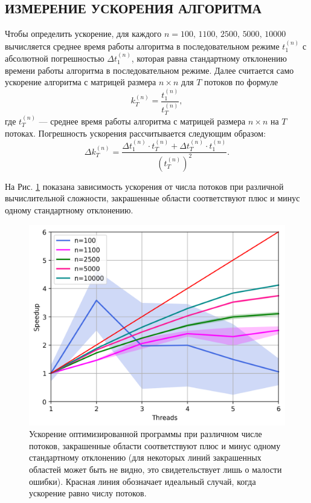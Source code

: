 \subsection{ИЗМЕРЕНИЕ УСКОРЕНИЯ АЛГОРИТМА}

Чтобы определить ускорение, для каждого $n=100,\, 1100,\, 2500,\, 5000,\, 10000$ вычисляется среднее время работы алгоритма в последовательном режиме $t^{(n)}_1$ с абсолютной погрешностью $\Delta t^(n)_1$, которая равна стандартному отклонению времени работы алгоритма в последовательном режиме. Далее считается само ускорение алгоритма с матрицей размера $n\times n$ для $T$ потоков по формуле
\begin{equation}
    k^{(n)}_T = \dfrac{t^{(n)}_1}{t^{(n)}_T},
\end{equation}
где $t^{(n)}_T$ --- среднее время работы алгоритма с матрицей размера $n\times n$ на $T$ потоках. Погрешность ускорения рассчитывается следующим образом:
\begin{equation}
   \Delta k^{(n)}_T = \dfrac{\Delta t^{(n)}_1 \cdot t^{(n)}_T + \Delta t^{(n)}_T \cdot t^{(n)}_1}{(t^{(n)}_T)^2}.
\end{equation}

На Рис. \ref{fig:speedup_vs_threads} показана зависимость ускорения от числа потоков при различной вычислительной сложности, закрашенные области соответствуют плюс и минус одному стандартному отклонению.
\begin{figure}[htbp]
    \centering
    \includegraphics[scale=0.75]{fig/speedup_vs_threads.png}
    \caption{Ускорение оптимизированной программы при различном числе потоков, закрашенные области соответствуют плюс и минус одному стандартному отклонению (для некоторых линий закрашенных областей может быть не видно, это свидетельствует лишь о малости ошибки). Красная линия обозначает идеальный случай, когда ускорение равно числу потоков.}
    \label{fig:speedup_vs_threads}
\end{figure}
